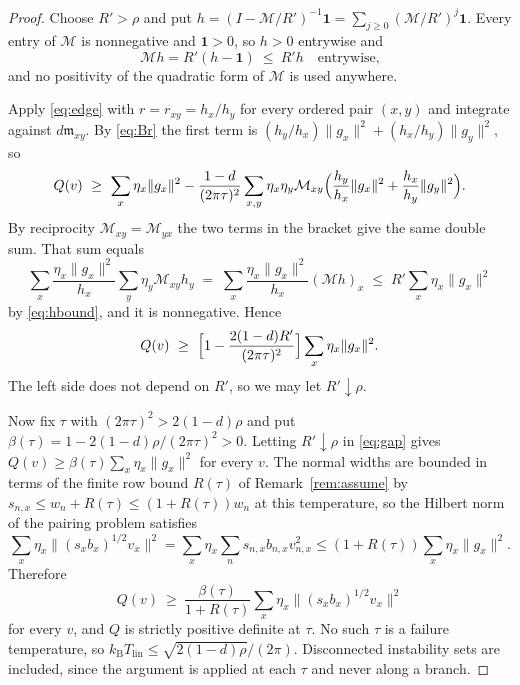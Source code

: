 \documentclass[aps,10pt,superscriptaddress,floatfix,amsmath,amssymb,nofootinbib]{revtex4-2}
\newcommand{\kb}{k_{\mathrm B}}
\newcommand{\Tlin}{T_{\mathrm{lin}}}
\newcommand{\mm}{\mathfrak m}
\newcommand{\Mmat}{\mathcal M}
\begin{document}
\begin{proof}
Choose $R'>\rho$ and put
$h=(I-\Mmat/R')^{-1}\mathbf 1=\sum_{j\ge0}(\Mmat/R')^{j}\mathbf 1$. Every entry of $\Mmat$
is nonnegative and $\mathbf 1>0$, so $h>0$ entrywise and
\begin{equation}\label{eq:hbound}
\Mmat h=R'(h-\mathbf 1)\ \le\ R'h\quad\text{entrywise,}
\end{equation}
and no positivity of the quadratic form of $\Mmat$ is used anywhere.

Apply \eqref{eq:edge} with $r=r_{xy}=h_x/h_y$ for every ordered pair $(x,y)$ and integrate
against $d\mm_{xy}$. By \eqref{eq:Br} the first term is
$(h_y/h_x)\|g_x\|^{2}+(h_x/h_y)\|g_y\|^{2}$, so
\begin{equation}\label{eq:step1}
Q(v)\ \ge\ \sum_x\eta_x\|g_x\|^{2}
-\frac{1-d}{(2\pi\tau)^{2}}\sum_{x,y}\eta_x\eta_y\Mmat_{xy}
\Bigl(\frac{h_y}{h_x}\|g_x\|^{2}+\frac{h_x}{h_y}\|g_y\|^{2}\Bigr).
\end{equation}
By reciprocity $\Mmat_{xy}=\Mmat_{yx}$ the two terms in the bracket give the same double
sum. That sum equals
\begin{equation}\label{eq:step2}
\sum_x\frac{\eta_x\|g_x\|^{2}}{h_x}\sum_y\eta_y\Mmat_{xy}h_y
\;=\;\sum_x\frac{\eta_x\|g_x\|^{2}}{h_x}(\Mmat h)_x
\;\le\;R'\sum_x\eta_x\|g_x\|^{2}
\end{equation}
by \eqref{eq:hbound}, and it is nonnegative. Hence
\begin{equation}\label{eq:gap}
Q(v)\ \ge\ \Bigl[1-\frac{2(1-d)R'}{(2\pi\tau)^{2}}\Bigr]\sum_x\eta_x\|g_x\|^{2}.
\end{equation}
The left side does not depend on $R'$, so we may let $R'\downarrow\rho$.

Now fix $\tau$ with $(2\pi\tau)^{2}>2(1-d)\rho$ and put
$\beta(\tau)=1-2(1-d)\rho/(2\pi\tau)^{2}>0$. Letting $R'\downarrow\rho$ in \eqref{eq:gap}
gives $Q(v)\ge\beta(\tau)\sum_x\eta_x\|g_x\|^{2}$ for every $v$. The normal widths are
bounded in terms of the finite row bound $R(\tau)$ of Remark~\ref{rem:assume} by
$s_{n,x}\le w_n+R(\tau)\le(1+R(\tau))w_n$ at this temperature, so the Hilbert norm of the
pairing problem satisfies
\begin{equation}\label{eq:norm}
\sum_x\eta_x\bigl\|(s_xb_x)^{1/2}v_x\bigr\|^{2}
=\sum_x\eta_x\sum_n s_{n,x}b_{n,x}v_{n,x}^{2}
\le(1+R(\tau))\sum_x\eta_x\|g_x\|^{2}.
\end{equation}
Therefore
\begin{equation}\label{eq:final}
Q(v)\ \ge\ \frac{\beta(\tau)}{1+R(\tau)}\sum_x\eta_x\bigl\|(s_xb_x)^{1/2}v_x\bigr\|^{2}
\end{equation}
for every $v$, and $Q$ is strictly positive definite at $\tau$. No such $\tau$ is a
failure temperature, so $\kb\Tlin\le\sqrt{2(1-d)\rho}/(2\pi)$. Disconnected instability
sets are included, since the argument is applied at each $\tau$ and never along a branch.
\end{proof}
\end{document}
